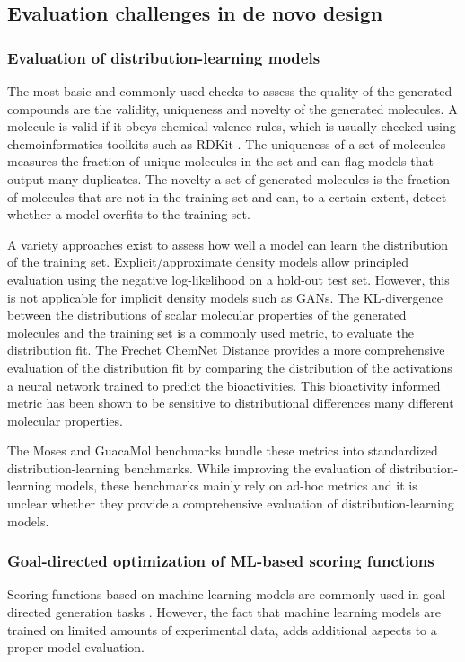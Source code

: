 \subsection{Evaluation challenges in de novo design}
\subsubsection{Evaluation of distribution-learning models}
The most basic and commonly used checks to assess the quality of the generated compounds are the
validity, uniqueness and novelty of the generated molecules. A molecule is valid if it obeys chemical
valence rules, which is usually checked using chemoinformatics toolkits such as RDKit
\citep{landrumRDKitOpensourceCheminformatics2006}. The uniqueness of a set of molecules measures the
fraction of unique molecules in the set and can flag models that output many duplicates. The novelty
a set of generated molecules is the fraction of molecules that are not in the training set and can,
to a certain extent, detect whether a model overfits to the training set.

A variety approaches exist to assess how well a model can learn the distribution of the training
set. Explicit/approximate density models allow principled evaluation using the negative
log-likelihood on a hold-out test set. However, this is not applicable for implicit density models
such as GANs. The KL-divergence between the distributions of scalar molecular properties
of the generated molecules and the training set is a commonly used metric, to evaluate the
distribution fit. The Frechet ChemNet Distance \citep{preuerFrechetChemNetDistance2018} provides a more
comprehensive evaluation of the distribution fit by comparing the distribution of the activations a
neural network trained to predict the bioactivities. This bioactivity informed metric has been shown
to be sensitive to distributional differences many different molecular properties.

The Moses \citep{polykovskiyMolecularSetsMOSES2020} and GuacaMol
\citep{brownGuacaMolBenchmarkingModels2019} benchmarks bundle these metrics into standardized
distribution-learning benchmarks. While improving the evaluation of distribution-learning
models, these benchmarks mainly rely on ad-hoc metrics and it is unclear
whether they provide a comprehensive evaluation of distribution-learning models.

\subsubsection{Goal-directed optimization of ML-based scoring functions}
Scoring functions based on machine learning models are commonly used in goal-directed generation
tasks \citep{todo}. However, the fact that machine learning models are trained on limited amounts of
experimental data, adds additional aspects to a proper model evaluation.

